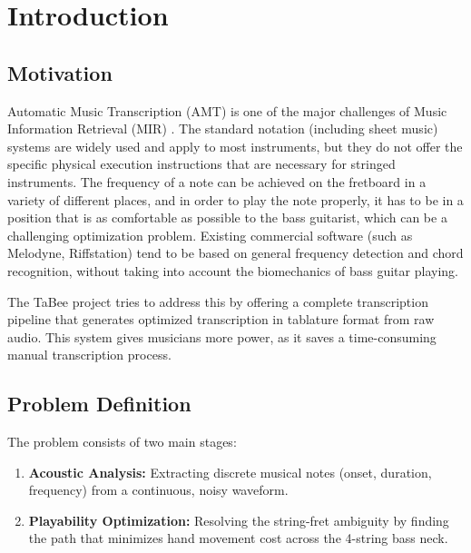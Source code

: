 \documentclass[a4paper, 12pt, titlepage]{article}
\begin{document}
\newpage
\tableofcontents
\newpage

\section{Introduction}

\subsection{Motivation}
Automatic Music Transcription (AMT) is one of the major challenges of Music Information Retrieval (MIR) \cite{downie2003,casey2008,benetos2013}. The standard notation (including sheet music) systems are widely used and apply to most instruments, but they do not offer the specific physical execution instructions that are necessary for stringed instruments. The frequency of a note can be achieved on the fretboard in a variety of different places, and in order to play the note properly, it has to be in a position that is as comfortable as possible to the bass guitarist, which can be a challenging optimization problem. Existing commercial software (such as Melodyne, Riffstation) tend to be based on general frequency detection and chord recognition, without taking into account the biomechanics of bass guitar playing. 

The TaBee project tries to address this by offering a complete transcription pipeline that generates optimized transcription in tablature format from raw audio. This system gives musicians more power, as it saves a time-consuming manual transcription process.

\subsection{Problem Definition}
The problem consists of two main stages:
\begin{enumerate}
    \item \textbf{Acoustic Analysis:} Extracting discrete musical notes (onset, duration, frequency) from a continuous, noisy waveform.
    \item \textbf{Playability Optimization:} Resolving the string-fret ambiguity by finding the path that minimizes hand movement cost across the 4-string bass neck.
\end{enumerate}
\end{document}
